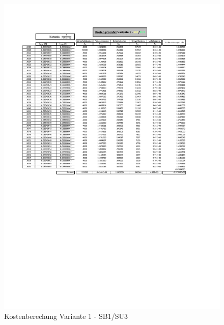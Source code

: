 \begin{figure}[h!]
	\centering
	\includegraphics[width=\textwidth]{figures/Anhang/f-00-A-V1-B1-U3}
	\caption{Kostenberechung Variante 1 - SB1/SU3}
\end{figure}

